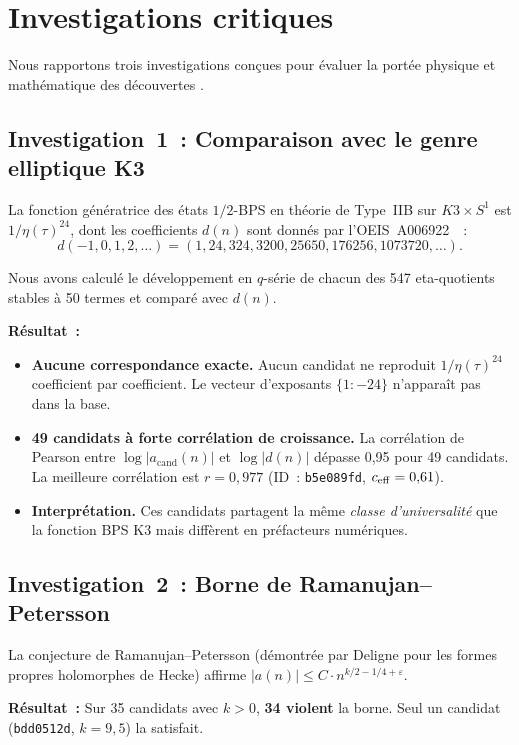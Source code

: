 \section{Investigations critiques}
\label{sec:investigations}

Nous rapportons trois investigations conçues pour évaluer la portée physique et mathématique des découvertes \RAMA{}.

\subsection{Investigation~1~: Comparaison avec le genre elliptique K3}

La fonction génératrice des états $1/2$-BPS en théorie de Type~IIB sur $K3 \times S^1$ est $1/\eta(\tau)^{24}$, dont les coefficients $d(n)$ sont donnés par l'OEIS~A006922~\cite{strominger_vafa_1996}~:
\[
  d(-1, 0, 1, 2, \ldots) = (1, 24, 324, 3200, 25650, 176256, 1073720, \ldots).
\]

Nous avons calculé le développement en $q$-série de chacun des 547 eta-quotients stables à 50 termes et comparé avec $d(n)$.

\textbf{Résultat~:}
\begin{itemize}
  \item \textbf{Aucune correspondance exacte.} Aucun candidat ne reproduit $1/\eta(\tau)^{24}$ coefficient par coefficient. Le vecteur d'exposants $\{1{:}{-24}\}$ n'apparaît pas dans la base.
  \item \textbf{49 candidats à forte corrélation de croissance.} La corrélation de Pearson entre $\log|a_{\mathrm{cand}}(n)|$ et $\log|d(n)|$ dépasse 0,95 pour 49 candidats. La meilleure corrélation est $r = 0{,}977$ (ID~: \texttt{b5e089fd}, $c_{\mathrm{eff}} = 0{,}61$).
  \item \textbf{Interprétation.} Ces candidats partagent la même \emph{classe d'universalité} que la fonction BPS K3 mais diffèrent en préfacteurs numériques.
\end{itemize}

\subsection{Investigation~2~: Borne de Ramanujan--Petersson}

La conjecture de Ramanujan--Petersson (démontrée par Deligne pour les formes propres holomorphes de Hecke) affirme $|a(n)| \leq C \cdot n^{k/2 - 1/4 + \varepsilon}$.

\textbf{Résultat~:} Sur 35 candidats avec $k > 0$, \textbf{34 violent} la borne. Seul un candidat (\texttt{bdd0512d}, $k = 9{,}5$) la satisfait.

